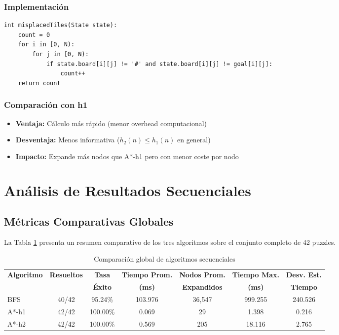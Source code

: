 \documentclass[12pt,a4paper]{article}
\begin{document}
\subsubsection{Implementación}

\begin{lstlisting}
int misplacedTiles(State state):
    count = 0
    for i in [0, N):
        for j in [0, N):
            if state.board[i][j] != '#' and state.board[i][j] != goal[i][j]:
                count++
    return count
\end{lstlisting}

\subsubsection{Comparación con h1}

\begin{itemize}
    \item \textbf{Ventaja:} Cálculo más rápido (menor overhead computacional)
    \item \textbf{Desventaja:} Menos informativa ($h_2(n) \leq h_1(n)$ en general)
    \item \textbf{Impacto:} Expande más nodos que A*-h1 pero con menor coste por nodo
\end{itemize}

\section{Análisis de Resultados Secuenciales}

\subsection{Métricas Comparativas Globales}

La Tabla \ref{tab:comparative_summary} presenta un resumen comparativo de los tres algoritmos sobre el conjunto completo de 42 puzzles.

\begin{table}[H]
\centering
\caption{Comparación global de algoritmos secuenciales}
\label{tab:comparative_summary}
\begin{tabular}{@{}lcccccc@{}}
\toprule
\textbf{Algoritmo} & \textbf{Resueltos} & \textbf{Tasa} & \textbf{Tiempo Prom.} & \textbf{Nodos Prom.} & \textbf{Tiempo Max.} & \textbf{Desv. Est.} \\
 & & \textbf{Éxito} & \textbf{(ms)} & \textbf{Expandidos} & \textbf{(ms)} & \textbf{Tiempo} \\
\midrule
BFS & 40/42 & 95.24\% & 103.976 & 36,547 & 999.255 & 240.526 \\
A*-h1 & 42/42 & 100.00\% & 0.069 & 29 & 1.398 & 0.216 \\
A*-h2 & 42/42 & 100.00\% & 0.569 & 205 & 18.116 & 2.765 \\
\bottomrule
\end{tabular}
\end{table}
\end{document}
